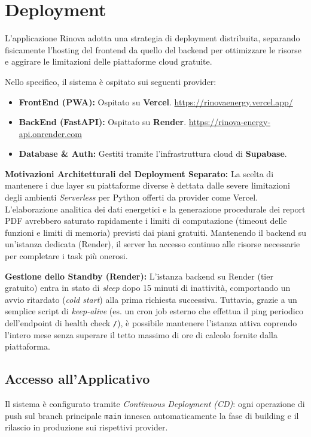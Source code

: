 \setcounter{section}{4}
\setlength{\parindent}{0pt}  
\setlength{\parskip}{6pt}    

\section{Deployment}

L'applicazione Rinova adotta una strategia di deployment distribuita, separando fisicamente l'hosting del frontend da quello del backend per ottimizzare le risorse e aggirare le limitazioni delle piattaforme cloud gratuite. 

Nello specifico, il sistema è ospitato sui seguenti provider:
\begin{itemize}
    \item \textbf{FrontEnd (PWA):} Ospitato su \textbf{Vercel}. 
    \url{https://rinovaenergy.vercel.app/}
    \item \textbf{BackEnd (FastAPI):} Ospitato su \textbf{Render}. 
    \url{https://rinova-energy-api.onrender.com}
    \item \textbf{Database \& Auth:} Gestiti tramite l'infrastruttura cloud di \textbf{Supabase}.
\end{itemize}

\textbf{Motivazioni Architetturali del Deployment Separato:}
La scelta di mantenere i due layer su piattaforme diverse è dettata dalle severe limitazioni degli ambienti \textit{Serverless} per Python offerti da provider come Vercel. L'elaborazione analitica dei dati energetici e la generazione procedurale dei report PDF avrebbero saturato rapidamente i limiti di computazione (timeout delle funzioni e limiti di memoria) previsti dai piani gratuiti. Mantenendo il backend su un'istanza dedicata (Render), il server ha accesso continuo alle risorse necessarie per completare i task più onerosi.

\textbf{Gestione dello Standby (Render):}
L'istanza backend su Render (tier gratuito) entra in stato di \textit{sleep} dopo 15 minuti di inattività, comportando un avvio ritardato (\textit{cold start}) alla prima richiesta successiva. Tuttavia, grazie a un semplice script di \textit{keep-alive} (es. un cron job esterno che effettua il ping periodico dell'endpoint di health check \texttt{/}), è possibile mantenere l'istanza attiva coprendo l'intero mese senza superare il tetto massimo di ore di calcolo fornite dalla piattaforma.

\subsection{Accesso all'Applicativo}
Il sistema è configurato tramite \textit{Continuous Deployment (CD)}: ogni operazione di push sul branch principale \texttt{main} innesca automaticamente la fase di building e il rilascio in produzione sui rispettivi provider.

